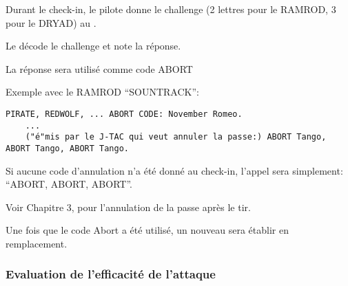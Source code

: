 \begin{e1}
	
	
	\begin{e2}
		\item Durant le check-in, le pilote donne le challenge (2 lettres pour le RAMROD, 3 pour le DRYAD) au \ja{}.
		\item Le \ja{} décode le challenge et note la réponse.
		\item La réponse sera utilisé comme code ABORT
		
		\begin{minipage}{\linewidth}
			\item Exemple avec le RAMROD ``SOUNTRACK'':
			\begin{lstlisting}[caption=Attaque: annulation avec RAMROD, label=9latkcancelramrod]
	PIRATE, REDWOLF, ... ABORT CODE: November Romeo.
	...
	("é"mis par le J-TAC qui veut annuler la passe:) ABORT Tango, ABORT Tango, ABORT Tango.
			\end{lstlisting}
		\end{minipage}
	\end{e2}
	
	
	\item Si aucune code d'annulation n'a été donné au check-in, l'appel sera simplement: ``ABORT, ABORT, ABORT''.
	
	\item Voir Chapitre 3,  pour l'annulation de la passe après le tir.
	
	\item Une fois que le code Abort a été utilisé, un nouveau sera établir en remplacement.
	
\end{e1}

\subsubsection{Evaluation de l'efficacité de l'attaque}%

